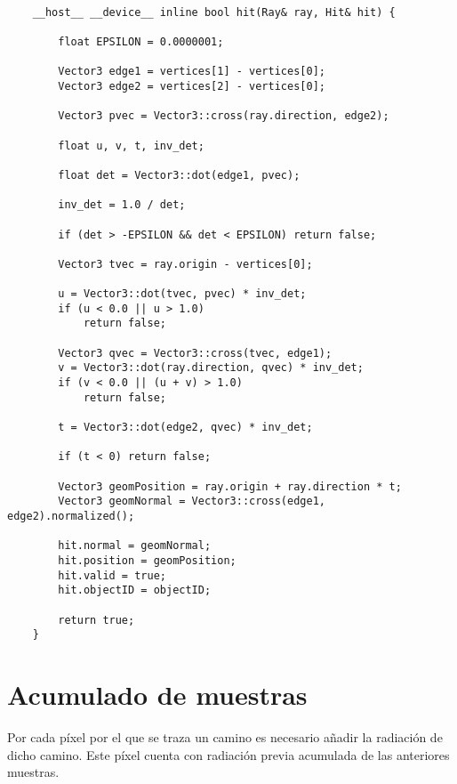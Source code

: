 \begin{minipage}[c]{0.95\textwidth}
\begin{lstlisting}[label={cod:triintersection}, caption={Adaptación de código Fast Minimum Storage Ray/Triangle Intersection\cite{moller1997fast} a Eleven Renderer}]
	
	__host__ __device__ inline bool hit(Ray& ray, Hit& hit) {

		float EPSILON = 0.0000001;

        Vector3 edge1 = vertices[1] - vertices[0];
        Vector3 edge2 = vertices[2] - vertices[0];

        Vector3 pvec = Vector3::cross(ray.direction, edge2);

        float u, v, t, inv_det;

        float det = Vector3::dot(edge1, pvec);

        inv_det = 1.0 / det;

        if (det > -EPSILON && det < EPSILON) return false;

        Vector3 tvec = ray.origin - vertices[0];

        u = Vector3::dot(tvec, pvec) * inv_det;
        if (u < 0.0 || u > 1.0)
            return false;

        Vector3 qvec = Vector3::cross(tvec, edge1);
        v = Vector3::dot(ray.direction, qvec) * inv_det;
        if (v < 0.0 || (u + v) > 1.0)
            return false;

        t = Vector3::dot(edge2, qvec) * inv_det;

        if (t < 0) return false;

        Vector3 geomPosition = ray.origin + ray.direction * t;
		Vector3 geomNormal = Vector3::cross(edge1, edge2).normalized();
		
		hit.normal = geomNormal;
		hit.position = geomPosition;
		hit.valid = true;
		hit.objectID = objectID;

        return true;
	}

\end{lstlisting}
\end{minipage}

\section{Acumulado de muestras}
	
Por cada píxel por el que se traza un camino es necesario añadir la radiación de dicho camino. Este píxel cuenta con radiación previa acumulada de las anteriores muestras.

